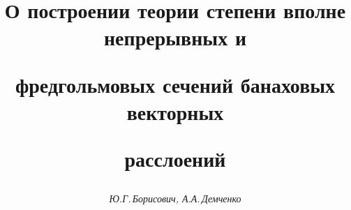 

 


%  




\newcommand{\const}{\operatorname{const}} 


\newcommand{\tts}[1]{}  


 




\setcounter{page}{3} 












 


\author{\it Ю.Г.\,Борисович, А.А.\,Демченко} 




\title{О построении теории степени вполне непрерывных и  


фредгольмовых сечений банаховых векторных  


расслоений} 


 


\date{} 




\pagestyle{plain} %


 




\maketitle 


